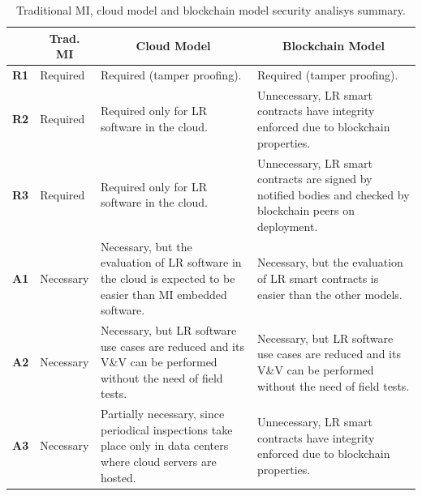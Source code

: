 \documentclass[journal]{IEEEtran}
\begin{document}
\begin{table}[t]
\centering
\caption{Traditional MI, cloud model and blockchain model security analisys summary.}
\label{t:sec_analysis}
\begin{tabularx}{1\textwidth}{|c|l|X|X|}
\hline
                                  & \multicolumn{1}{c|}{\textbf{Trad. MI}} & \multicolumn{1}{c|}{\textbf{Cloud Model}}                                                                             & \multicolumn{1}{c|}{\textbf{Blockchain Model}}                                                               \\ \hline
\multicolumn{1}{|c|}{\textbf{R1}} & Required                                     & Required (tamper proofing).                                                                                           & Required (tamper proofing).                                                                                  \\ \hline
\multicolumn{1}{|c|}{\textbf{R2}} & Required                                     & Required only for LR software in the cloud.                                                                           & Unnecessary, LR smart contracts have integrity enforced due to blockchain properties.                        \\ \hline
\multicolumn{1}{|c|}{\textbf{R3}} & Required                                     & Required only for LR software in the cloud.                                                                           & Unnecessary, LR smart contracts are signed by notified bodies and checked by blockchain peers on deployment. \\ \hline
\textbf{A1}                       & Necessary                                    & Necessary, but the evaluation of LR software in the cloud is expected to be easier than MI embedded software.         & Necessary, but the evaluation of LR smart contracts is easier than the other models.                         \\ \hline
\textbf{A2}                       & Necessary                                    & Necessary, but LR software use cases are reduced and its V\&V can be performed without the need of field tests.               & Necessary, but LR software use cases are reduced and its V\&V can be performed without the need of field tests.      \\ \hline
\textbf{A3}                       & Necessary                                    & Partially necessary, since periodical inspections take place only in data centers where cloud servers are hosted. & Unnecessary, LR smart contracts have integrity enforced due to blockchain properties.                        \\ \hline
\end{tabularx}
\end{table}
\end{document}
